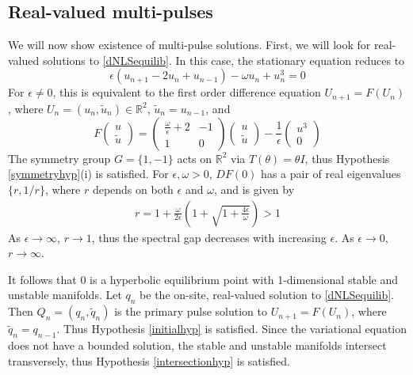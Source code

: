 \documentclass[12pt]{article}
\def\R{{\mathbb R}}
\begin{document}
\subsection{Real-valued multi-pulses}

We will now show existence of multi-pulse solutions. First, we will look for real-valued solutions to \eqref{dNLSequilib}. In this case, the stationary equation reduces to
\begin{equation*}
\epsilon(u_{n+1} - 2 u_n + u_{n-1}) - \omega u_n + u_n^3 = 0
\end{equation*}
For $\epsilon \neq 0$, this is equivalent to the first order difference equation $U_{n+1} = F(U_n)$, where $U_n = (u_n, \tilde{u}_n) \in \R^2$, $\tilde{u}_n = u_{n-1}$, and 
\begin{equation}\label{dnlsdiffR2}
F
\begin{pmatrix}
u \\ \tilde{u}
\end{pmatrix} =
\begin{pmatrix}
\frac{\omega}{\epsilon} + 2 & -1 \\
1 & 0
\end{pmatrix}
\begin{pmatrix}
u \\ \tilde{u}
\end{pmatrix}
- \frac{1}{\epsilon} 
\begin{pmatrix}
u^3 \\ 0
\end{pmatrix}
\end{equation}
The symmetry group $G = \{ 1, -1\}$ acts on $\R^2$ via $T(\theta) = \theta I$, thus Hypothesis \ref{symmetryhyp}(i) is satisfied. For $\epsilon, \omega > 0$, $DF(0)$ has a pair of real eigenvalues $\{r, 1/r \}$, where $r$ depends on both $\epsilon$ and $\omega$, and is given by
\begin{align}\label{defr}
r = 1 + \frac{\omega}{2 \epsilon} \left( 1 + \sqrt{1 + \frac{4 \epsilon}{\omega}} \right) > 1
\end{align}
As $\epsilon \rightarrow \infty$, $r \rightarrow 1$, thus the spectral gap decreases with increasing $\epsilon$. As $\epsilon \rightarrow 0$, $r \rightarrow \infty$.

It follows that 0 is a hyperbolic equilibrium point with 1-dimensional stable and unstable manifolds. Let $q_n$ be the on-site, real-valued solution to \eqref{dNLSequilib}. Then $Q_n = (q_n, \tilde{q}_n)$ is the primary pulse solution to $U_{n+1} = F(U_n)$, where $\tilde{q}_n = q_{n-1}$. Thus Hypothesis \ref{initialhyp} is satisfied. Since the variational equation does not have a bounded solution, the stable and unstable manifolds intersect transversely, thus Hypothesis \ref{intersectionhyp} is satisfied. 
\end{document}
